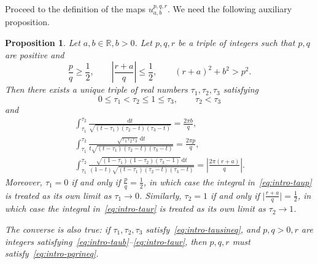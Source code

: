 \documentclass{amsart}
\let\le\leqslant
\let\ge\geqslant
\renewcommand{\d}{\mathrm{d}}
\theoremstyle{plain}
\newtheorem{proposition}{Proposition}[section]
\theoremstyle{definition}
\theoremstyle{remark}
\begin{document}
Proceed to the definition of the maps \(u_{a,b}^{p,q,r}\). We need the following
auxiliary proposition.

\begin{proposition}\label{pr:intro-taus}
Let \(a,b\in\mathbb R,b>0\). Let \(p,q,r\) be a triple of integers such that
\(p,q\) are positive and
\begin{equation}\label{eq:intro-pqrineq}
\frac{p}q\ge\frac{1}2,\qquad
\left|\frac{r+a}q\right|\le\frac{1}2,\qquad
(r+a)^2+b^2>p^2.
\end{equation}
Then there exists a unique triple of real numbers \(\tau_1,\tau_2,\tau_3\)
satisfying
\begin{equation}\label{eq:intro-tausineq}
0\le\tau_1<\tau_2\le 1\le\tau_3,\qquad\tau_2<\tau_3
\end{equation}
and
\begin{gather}
\int_{\tau_1}^{\tau_2}\frac{\d t}{\sqrt{(t-\tau_1)(\tau_2-t)(\tau_3-t)}}=
\frac{2\pi b}q,\label{eq:intro-taub}\\
\int_{\tau_1}^{\tau_2}
\frac{\sqrt{\tau_1\tau_2\tau_3}\,\d t}{t\sqrt{(t-\tau_1)(\tau_2-t)(\tau_3-t)}}=
\frac{2\pi p}q,\label{eq:intro-taup}\\
\int_{\tau_1}^{\tau_2}
\frac{\sqrt{(1-\tau_1)(1-\tau_2)(\tau_3-1)}\,\d t}
{(1-t)\sqrt{(t-\tau_1)(\tau_2-t)(\tau_3-t)}}=\left|\frac{2\pi (r+a)}q\right|.
\label{eq:intro-taur}
\end{gather}
Moreover, \(\tau_1=0\) if and only if \(\frac{p}q=\frac{1}2\), in which case the
integral in~\eqref{eq:intro-taup} is treated as its own limit as \(\tau_1\to
0\). Similarly, \(\tau_2=1\) if and only if
\(\bigl|\frac{r+a}q\bigr|=\frac{1}2\), in which case the integral
in~\eqref{eq:intro-taur} is treated as its own limit as \(\tau_2\to 1\).

The converse is also true: if \(\tau_1,\tau_2,\tau_3\)
satisfy~\eqref{eq:intro-tausineq}, and \(p,q>0,r\) are integers
satisfying~\eqref{eq:intro-taub}--\eqref{eq:intro-taur}, then \(p,q,r\) must
satisfy~\eqref{eq:intro-pqrineq}. 
\end{proposition}
\end{document}
